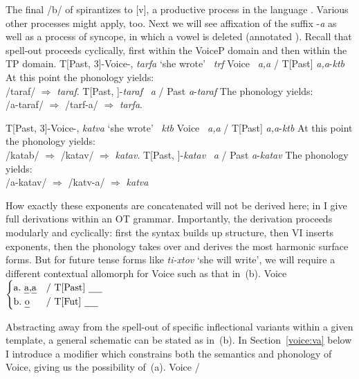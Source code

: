 {The final /b/ of  spirantizes to [v], a productive process in the language \citep{temkinmartinzemuellner16,kastner17gjgl,kastner18nllt}. Various other processes might apply, too. Next we will see affixation of the  suffix -\emph{a} as well as a process of syncope, in which a vowel is deleted (annotated ). Recall that spell-out proceeds cyclically, first within the VoiceP domain and then within the TP domain.
\pex T[Past, 3]-Voice-, \emph{tarfa} `she wrote'
	\a {} \lra~\emph{trf}
	\a Voice \lra~\emph{a,a} / T[Past] \trace
	\a \emph{a,a}-\emph{ktb}
	\a At this point the phonology yields:\\
		/taraf/ $\Rightarrow$ \emph{taraf}.
	\a T[Past, ]-\emph{taraf}
	\a {} \lra~\emph{a} / Past \trace
	\a \emph{a}-\emph{taraf}
	\a The phonology yields:\\
		/a-taraf/ $\Rightarrow$ /tarf-a/ $\Rightarrow$ \emph{tarfa}.
\xe

\pex T[Past, 3]-Voice-, \emph{katva} `she wrote'
	\a {} \lra~\emph{ktb}
	\a Voice \lra~\emph{a,a} / T[Past] \trace
	\a \emph{a,a}-\emph{ktb}
	\a At this point the phonology yields:\\
		/katab/ $\Rightarrow$ /katav/ $\Rightarrow$ \emph{katav}.
	\a T[Past, ]-\emph{katav}
	\a {} \lra~\emph{a} / Past \trace
	\a \emph{a}-\emph{katav}
	\a The phonology yields:\\
		/a-katav/ $\Rightarrow$ /katv-a/ $\Rightarrow$ \emph{katva}
\xe

How exactly these exponents are concatenated will not be derived here; in \cite{kastner18nllt} I give full derivations within an OT grammar. Importantly, the derivation proceeds modularly and cyclically: first the syntax builds up structure, then VI inserts exponents, then the phonology takes over and derives the most harmonic surface forms. But for future tense forms like \emph{ti-xtov} `she will write', we will require a different contextual allomorph for Voice such as that in~(\nextx b).
\ex \label{vi:voice} Voice \lra $\begin{cases}
		\text{a.~\emph{a},\emph{a}} & \text{/ T[Past] \trace}\\
		\text{b.~\emph{o}} & \text{/ T[Fut] \trace}\\
		\end{cases}$
\xe

Abstracting away from the spell-out of specific inflectional variants within a given template, a general schematic can be stated as in~(\nextx b). In Section~\ref{voice:va} below I introduce a modifier which constrains both the semantics and phonology of Voice, giving us the possibility of~(\nextx a).
\pex Voice {\lra}
	\a {\tpie} / {\trace} {\va}
	\a {\tkal}
\xe

}
